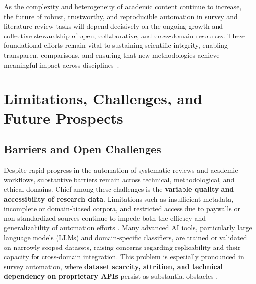 As the complexity and heterogeneity of academic content continue to increase, the future of robust, trustworthy, and reproducible automation in survey and literature review tasks will depend decisively on the ongoing growth and collective stewardship of open, collaborative, and cross-domain resources. These foundational efforts remain vital to sustaining scientific integrity, enabling transparent comparisons, and ensuring that new methodologies achieve meaningful impact across disciplines~\cite{ref26,ref27,ref31,ref32,ref33,ref34,ref35,ref68,ref78,ref80,ref84,ref98,ref100,ref102,ref104,ref106}.

\section{Limitations, Challenges, and Future Prospects}

\subsection{Barriers and Open Challenges}

Despite rapid progress in the automation of systematic reviews and academic workflows, substantive barriers remain across technical, methodological, and ethical domains. Chief among these challenges is the \textbf{variable quality and accessibility of research data}. Limitations such as insufficient metadata, incomplete or domain-biased corpora, and restricted access due to paywalls or non-standardized sources continue to impede both the efficacy and generalizability of automation efforts \cite{ref41,ref42,ref43,ref44,ref54,ref55,ref56,ref57,ref60,ref61,ref62,ref63,ref64,ref65,ref68,ref70,ref71,ref73,ref74,ref75,ref76,ref78,ref80,ref81,ref82,ref83,ref84,ref85,ref86,ref87,ref88,ref89,ref90,ref91,ref92,ref93,ref94,ref95,ref96,ref97,ref98,ref99,ref100,ref103,ref104,ref105,ref106,ref108,ref109,ref110,ref111,ref112,ref113,ref114,ref115,ref117}. Many advanced AI tools, particularly large language models (LLMs) and domain-specific classifiers, are trained or validated on narrowly scoped datasets, raising concerns regarding replicability and their capacity for cross-domain integration. This problem is especially pronounced in survey automation, where \textbf{dataset scarcity, attrition, and technical dependency on proprietary APIs} persist as substantial obstacles \cite{ref117}.

